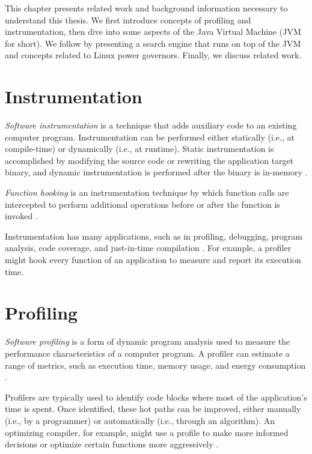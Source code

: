 \label{cap:background}

This chapter presents related work and background information necessary to understand this thesis. We first introduce concepts of profiling and instrumentation, then dive into some aspects of the Java Virtual Machine (JVM for short). We follow by presenting a search engine that runs on top of the JVM and concepts related to Linux power governors. Finally, we discuss related work.

\section{Instrumentation}

\emph{Software instrumentation} is a technique that adds auxiliary code to an existing computer program. Instrumentation can be performed either statically (i.e., at compile-time) or dynamically (i.e., at runtime). Static instrumentation is accomplished by modifying the source code or rewriting the application target binary, and dynamic instrumentation is performed after the binary is in-memory \cite{kempf2007instrumentation}.

\emph{Function hooking} is an instrumentation technique by which function calls are intercepted to perform additional operations before or after the function is invoked \cite{lopez2017survey}.

Instrumentation has many applications, such as in profiling, debugging, program analysis, code coverage, and just-in-time compilation \cite{graham1982gprof,zhao2008debug,seward2005memcheck,ivankovic2019googlecov,openjdktier}. For example, a profiler might hook every function of an application to measure and report its execution time.

\section{Profiling}

\emph{Software profiling} is a form of dynamic program analysis used to measure the performance characteristics of a computer program. A profiler can estimate a range of metrics, such as execution time, memory usage, and energy consumption \cite{graham1982gprof,reiss2009visualizing,pathak2012energy}.

Profilers are typically used to identify code blocks where most of the application's time is spent. Once identified, these hot paths can be improved, either manually (i.e., by a programmer) or automatically (i.e., through an algorithm). An optimizing compiler, for example, might use a profile to make more informed decisions or optimize certain functions more aggressively \cite{pettis1990guided}.

